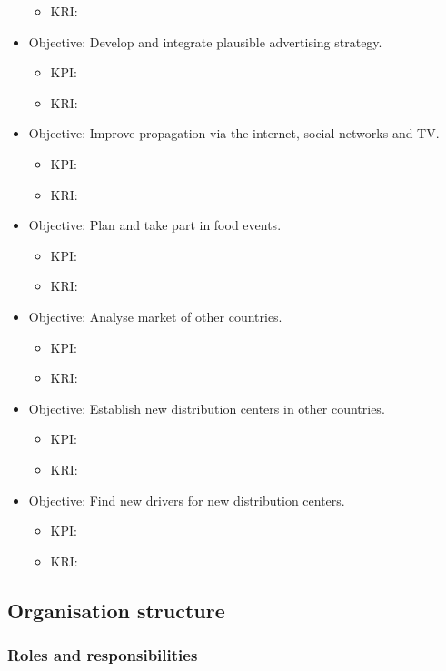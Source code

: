 \documentclass[11pt,a4paper]{article}
\begin{document}
\begin{itemize}
\begin{itemize}
        \item KRI: 
    \end{itemize}
    \item Objective: Develop and integrate plausible advertising strategy.
    \begin{itemize}
        \item KPI: 
        \item KRI: 
    \end{itemize}
    \item Objective: Improve propagation via the internet, social networks and TV.
    \begin{itemize}
        \item KPI: 
        \item KRI: 
    \end{itemize}
    \item Objective: Plan and take part in food events.
    \begin{itemize}
        \item KPI: 
        \item KRI: 
    \end{itemize}
    \item Objective: Analyse market of other countries.
    \begin{itemize}
        \item KPI: 
        \item KRI: 
    \end{itemize}
    \item Objective: Establish new distribution centers in other countries.
    \begin{itemize}
        \item KPI: 
        \item KRI: 
    \end{itemize}
    \item Objective: Find new drivers for new distribution centers.
    \begin{itemize}
        \item KPI: 
        \item KRI: 
    \end{itemize}
\end{itemize}


\subsection{Organisation structure}
\subsubsection{Roles and responsibilities}
\end{document}
